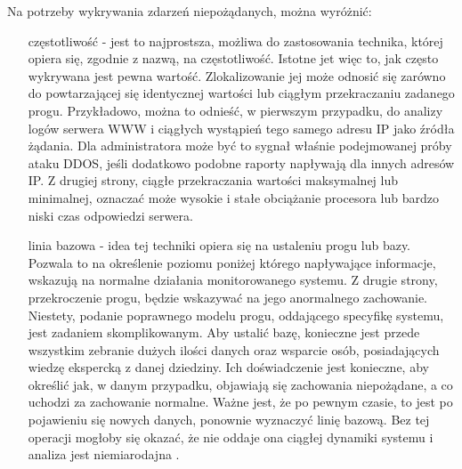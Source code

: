         Na potrzeby wykrywania zdarzeń niepożądanych, można wyróżnić:
        \begin{itemize}
            \item[częstotliwość] - jest to najprostsza, możliwa do zastosowania technika, której opiera się,
            zgodnie z nazwą, na częstotliwość. Istotne jet więc to, jak często wykrywana jest pewna wartość.
            Zlokalizowanie jej może odnosić się zarówno do powtarzającej się identycznej wartości lub ciągłym
            przekraczaniu zadanego progu. Przykładowo, można to odnieść, w pierwszym przypadku,
            do analizy logów serwera WWW i ciągłych wystąpień tego samego adresu IP jako źródła żądania.
            Dla administratora może być to sygnał właśnie podejmowanej próby ataku DDOS, jeśli dodatkowo
            podobne raporty napływają dla innych adresów IP. Z drugiej strony, ciągłe przekraczania wartości
            maksymalnej lub minimalnej, oznaczać może wysokie i stałe obciążanie procesora lub bardzo
            niski czas odpowiedzi serwera. 
            \item[linia bazowa] - idea tej techniki opiera się na ustaleniu progu lub bazy. Pozwala to
            na określenie poziomu poniżej którego napływające informacje, wskazują na normalne działania
            monitorowanego systemu. Z drugie strony, przekroczenie progu, będzie wskazywać na jego
            anormalnego zachowanie. Niestety, podanie poprawnego modelu progu, oddającego
            specyfikę systemu, jest zadaniem skomplikowanym. Aby ustalić bazę, konieczne jest przede wszystkim
            zebranie dużych ilości danych oraz wsparcie osób, posiadających wiedzę ekspercką z danej dziedziny.
            Ich doświadczenie jest konieczne, aby określić jak, w danym przypadku, objawiają się zachowania
            niepożądane, a co uchodzi za zachowanie normalne. Ważne jest, że po pewnym czasie, to jest
            po pojawieniu się nowych danych, ponownie wyznaczyć linię bazową. Bez tej operacji mogłoby się okazać,
            że nie oddaje ona ciągłej dynamiki systemu i analiza jest niemiarodajna \cite{logging_log_management}.
        \end{itemize}